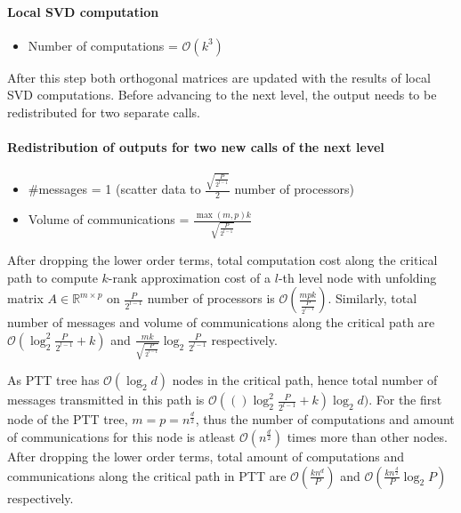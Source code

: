 \documentclass[sigconf]{acmart}
\begin{document}
\paragraph{Local SVD computation}
\begin{itemize}
	\item Number of computations = $\mathcal{O}(k^3)$
\end{itemize}
After this step both orthogonal matrices are updated with the results of local SVD computations. Before advancing to the next level, the output needs to be redistributed for two separate calls.
\paragraph{Redistribution of outputs for two new calls of the next level}
\begin{itemize}
	\item \#messages = 1 (scatter data to $\frac{\sqrt{\frac{P}{2^{l-1}}}}{2}$ number of processors)
	\item Volume of communications = $\frac{\max(m,p)k}{\sqrt{\frac{P}{2^{l-1}}}}$ 
\end{itemize}
After dropping the lower order terms, total computation cost along the critical path to compute $k$-rank approximation cost of a $l$-th level node with unfolding matrix $A\in \mathbb{R}^{m\times p}$ on $\frac{P}{2^{l-1}}$ number of processors is $\mathcal{O}(\frac{mpk}{\frac{P}{2^{l-1}}})$. Similarly, total number of messages and volume of communications along the critical path are
 $\mathcal{O}(\log_2^2\frac{P}{2^{l-1}} +k)$ and $\frac{mk}{\sqrt{\frac{P}{2^{l-1}}}} \log_2 \frac{P}{2^{l-1}}$ respectively.



As PTT tree has $\mathcal{O}(\log_2 d)$ nodes in the critical path, hence total number of messages transmitted in this path is  $\mathcal{O}(()\log_2^2\frac{P}{2^{l-1}} +k)\log_2 d)$. For the first node of the PTT tree, $m=p=n^\frac{d}{2}$, thus the number of computations and amount of communications for this node is atleast $\mathcal{O}(n^\frac{d}{2})$ times more than other nodes. After dropping the lower order terms, total amount of computations and communications along the critical path in PTT are $\mathcal{O}(\frac{kn^d}{P})$ and $\mathcal{O}(\frac{kn^\frac{d}{2}}{P} \log_2 P)$ respectively.


\end{document}
